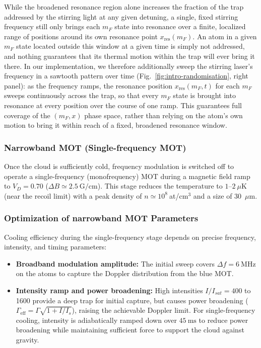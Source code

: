 While the broadened resonance region alone increases the fraction of the trap
addressed by the stirring light at any given detuning, a single, fixed
stirring frequency still only brings each $m_F$ state into resonance over a
finite, localized range of positions around its own resonance point
$x_{\text{res}}(m_F)$. An atom in a given $m_F$ state located outside this
window at a given time is simply not addressed, and nothing guarantees that
its thermal motion within the trap will ever bring it there. In our
implementation, we therefore additionally sweep the stirring laser's
frequency in a sawtooth pattern over time (Fig.~\ref{fig:intro-randomisation},
right panel): as the frequency ramps, the resonance position
$x_{\text{res}}(m_F,t)$ for each $m_F$ sweeps continuously across the trap,
so that every $m_F$ state is brought into resonance at every position over
the course of one ramp. This guarantees full coverage of the $(m_F,x)$ phase
space, rather than relying on the atom's own motion to bring it within reach
of a fixed, broadened resonance window.

\subsubsection{Narrowband MOT (Single-frequency MOT)}
Once the cloud is sufficiently cold, frequency modulation is switched off to operate a
single-frequency (monofrequency) MOT during a magnetic field ramp to $V_D = 0.70$
($\Delta B \simeq 2.5~\text{G/cm}$). This
stage reduces the temperature to $1\text{--}2~\mu\text{K}$ (near the recoil limit) with a
peak density of $n \simeq 10^8~$at/cm$^3$ and a size of 30~$\mu$m.

\subsubsection{Optimization of narrowband MOT Parameters}

Cooling efficiency during the single-frequency stage depends on precise frequency, intensity, and timing parameters:
\begin{itemize}
    \item \textbf{Broadband modulation amplitude:} The initial sweep covers $\Delta f = 6~\text{MHz}$ on the atoms to capture the Doppler distribution from the blue MOT.
    
    \item \textbf{Intensity ramp and power broadening:} High intensities $I/I_{sat}=400 $ to 1600 provide a deep trap for initial capture, but causes power broadening ($\Gamma_{\text{eff}} = \Gamma \sqrt{1 + I/I_s}$), raising the achievable Doppler limit. For single-frequency cooling, intensity is adiabatically ramped down over $45~\text{ms}$ to reduce power broadening while maintaining sufficient force to support the cloud against gravity.
\end{itemize}

